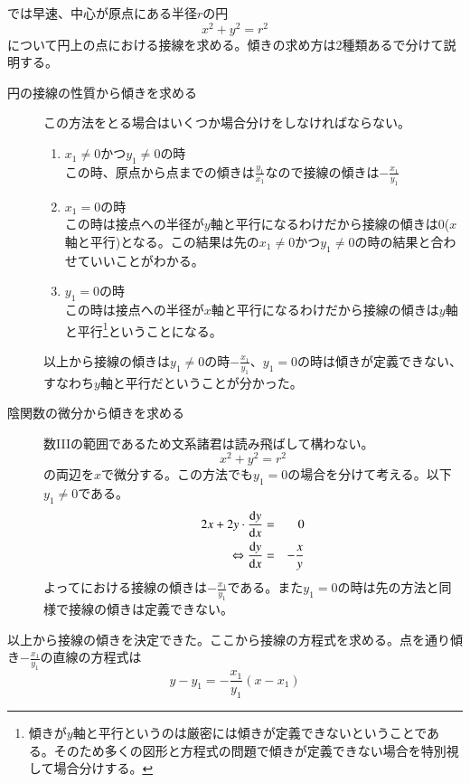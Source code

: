    では早速、中心が原点にある半径$r$の円
    \[
    x^2 +y^2=r^2
    \]
    について円上の点\pt における接線を求める。傾きの求め方は2種類あるで分けて説明する。
    \begin{description}
        \item[円の接線の性質から傾きを求める] この方法をとる場合はいくつか場合分けをしなければならない。
        \begin{enumerate}
            \item $x_1 \neq 0$かつ$y_1 \neq 0$の時\\
            この時、原点から点\pt までの傾きは$\frac{y_1}{x_1}$なので接線の傾きは$-\frac{x_1}{y_1}$
            \item $x_1=0$の時\\
            この時は接点への半径が$y$軸と平行になるわけだから接線の傾きは$0$($x$軸と平行)となる。この結果は先の$x_1 \neq 0$かつ$y_1 \neq 0$の時の結果と合わせていいことがわかる。
            \item $y_1 = 0$の時\\
            この時は接点への半径が$x$軸と平行になるわけだから接線の傾きは$y$軸と平行\footnote{傾きが$y$軸と平行というのは厳密には傾きが定義できないということである。そのため多くの図形と方程式の問題で傾きが定義できない場合を特別視して場合分けする。}ということになる。
        \end{enumerate}
        以上から接線の傾きは$y_1 \neq 0$の時$-\frac{x_1}{y_1}$、$y_1 = 0$の時は傾きが定義できない、すなわち$y$軸と平行だということが分かった。
        \item[陰関数の微分から傾きを求める] 数I\hspace{-.1em}I\hspace{-.1em}Iの範囲であるため文系諸君は読み飛ばして構わない。\\
        \[
        x^2 +y^2=r^2
        \]
        の両辺を$x$で微分する。この方法でも$y_1 = 0$の場合を分けて考える。以下$y_1 \neq 0$である。
        \begin{eqnarray*}
            2x + 2y \cdot \frac{{\rm d}y}{{\rm d}x} &=& 0\\
            \Leftrightarrow \frac{{\rm d}y}{{\rm d}x} &=& -\frac{x}{y}
        \end{eqnarray*}
        よって\pt における接線の傾きは$-\frac{x_1}{y_1}$である。また$y_1 = 0$の時は先の方法と同様で接線の傾きは定義できない。
    \end{description}
    以上から接線の傾きを決定できた。ここから接線の方程式を求める。点\pt を通り傾き$-\frac{x_1}{y_1}$の直線の方程式は
    \begin{equation}
        y-y_1 = -\frac{x_1}{y_1} (x-x_1)
        \label{eq:2-1}
    \end{equation}
